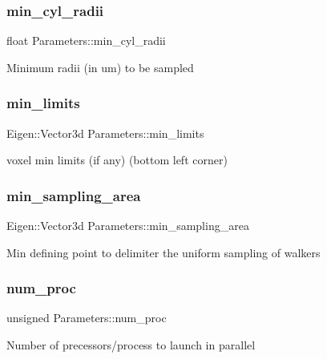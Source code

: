 \subsubsection{\texorpdfstring{min\+\_\+cyl\+\_\+radii}{min\_cyl\_radii}}
{\footnotesize\ttfamily float Parameters\+::min\+\_\+cyl\+\_\+radii}

Minimum radii (in um) to be sampled \mbox{\label{class_parameters_aa9d387477810c2bb574b83ecd1fbf8f0}} 
\subsubsection{\texorpdfstring{min\+\_\+limits}{min\_limits}}
{\footnotesize\ttfamily Eigen\+::\+Vector3d Parameters\+::min\+\_\+limits}

voxel min limits (if any) (bottom left corner) \mbox{\label{class_parameters_a8b7e1481e63d5ac9a36eed8ab310d315}} 
\subsubsection{\texorpdfstring{min\+\_\+sampling\+\_\+area}{min\_sampling\_area}}
{\footnotesize\ttfamily Eigen\+::\+Vector3d Parameters\+::min\+\_\+sampling\+\_\+area}

Min defining point to delimiter the uniform sampling of walkers \mbox{\label{class_parameters_aab0de21efc3f85e5c44205ed5ebf9d4d}} 
\subsubsection{\texorpdfstring{num\+\_\+proc}{num\_proc}}
{\footnotesize\ttfamily unsigned Parameters\+::num\+\_\+proc}

Number of precessors/process to launch in parallel \mbox{\label{class_parameters_a3475e7efae778bc7720fe6c17274eef0}} 
